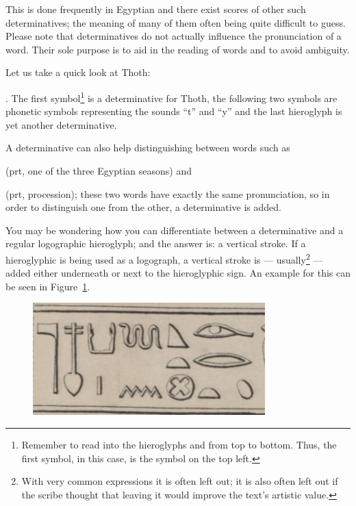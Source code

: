 \documentclass[a5paper,twoside,11pt]{report}
\begin{document}
    This is done frequently in Egyptian and there exist scores of other such determinatives; the meaning of many of them often being quite difficult to guess. Please note that determinatives do not actually influence the pronunciation of a word. Their sole purpose is to aid in the reading of words and to avoid ambiguity.

		Let us take a quick look at Thoth: \begin{hieroglyph}{\leavevmode {}\HinterSignsSpace
{}}\end{hieroglyph}. The first symbol\footnote{Remember to read into the hieroglyphs and from top to bottom. Thus, the first symbol, in this case, is the symbol on the top left.} is a determinative for Thoth, the following two symbols are phonetic symbols representing the sounds “t” and “y” and the last hieroglyph is yet another determinative. 
		
		A determinative can also help distinguishing between words such as \begin{hieroglyph}{\leavevmode {}\HinterSignsSpace
{}}\end{hieroglyph} (prt, one of the three Egyptian seasons) and \begin{hieroglyph}{\leavevmode {}\HinterSignsSpace
{}}\end{hieroglyph} (prt, procession); these two words have exactly the same pronunciation, so in order to distinguish one from the other, a determinative is added.

		You may be wondering how you can differentiate between a determinative and a regular logographic hieroglyph; and the answer is: a vertical stroke. If a hieroglyphic is being used as a logograph, a vertical stroke is — usually\footnote{With very common expressions it is often left out; it is also often left out if the scribe thought that leaving it would improve the text’s artistic value.} — added either underneath or next to the hieroglyphic sign. An example for this can be seen in Figure~\ref{fig:3}.

		\begin{figure}
			\centering
			\includegraphics[width=0.8\textwidth]{images/img3.jpg}
			\caption{\cite{NYC:Ernst_Ptolost}}
			\label{fig:3}
		\end{figure}
\end{document}
